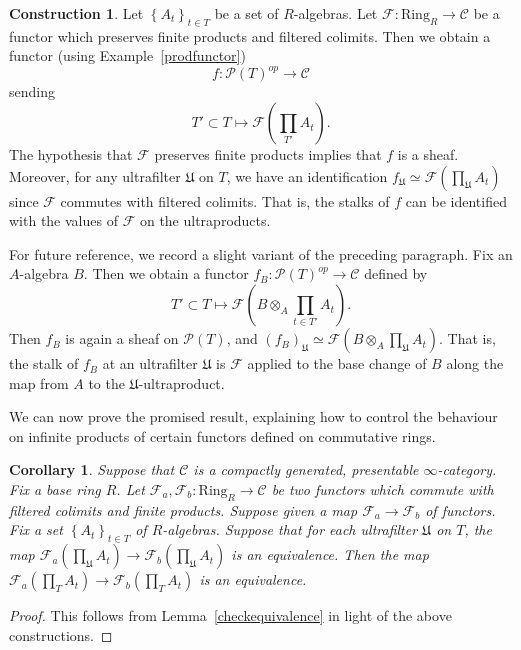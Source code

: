 \documentclass[reqno]{amsart}
\newtheorem{corollary}[theorem]{Corollary}
\theoremstyle{definition}
\newtheorem{cons}[theorem]{Construction}
\begin{document}
\begin{cons}
\label{varcons}
Let $\left\{A_t\right\}_{t \in T}$ be a  set of $R$-algebras. Let
$\mathcal{F}\colon  \mathrm{Ring}_R \to \mathcal{C}$ be a functor which preserves finite products and filtered colimits.  Then we obtain a functor (using Example~\ref{prodfunctor})
\[ f\colon  \mathcal{P}(T)^{op}  \to \mathcal{C} \]
sending 
\[ T' \subset T \mapsto \mathcal{F}( \prod_{T'} A_t) .  \]
The hypothesis that $\mathcal{F}$ preserves finite products implies that $f$ is a sheaf.  Moreover, for any ultrafilter $\mathfrak{U}$ on $T$, we have an identification $f_{\mathfrak{U}} \simeq \mathcal{F}( \prod_{\mathfrak{U}} A_t)$ since $\mathcal{F}$ commutes with filtered colimits. That is, the stalks of $f$ can be identified with the values of $\mathcal{F}$ on the ultraproducts. 

For future reference, we record a slight variant of the preceding paragraph. Fix an $A$-algebra $B$.  Then we obtain a functor 
$f_B\colon  \mathcal{P}(T)^{op} \to \mathcal{C}$ defined by 
\[ T' \subset T \mapsto \mathcal{F}( B \otimes_A \prod_{t \in T'} A_t ).  \]
Then $f_B$ is again a sheaf on $\mathcal{P}(T)$, and $(f_B)_{\mathfrak{U}} \simeq \mathcal{F}( B  \otimes_A \prod_{\mathfrak{U}} A_t)$.  That is, the stalk of $f_B$ at an ultrafilter $\mathfrak{U}$ is $\mathcal{F}$ applied to the base change of $B$ along the map from $A$ to the $\mathfrak{U}$-ultraproduct. 
\end{cons}


We can now prove the promised result, explaining how to control the behaviour on infinite products of certain functors defined on commutative rings.




\begin{corollary} 
\label{ultradetectsequivalence}
Suppose that $\mathcal{C}$ is a compactly generated, presentable $\infty$-category. 
Fix a base ring $R$. Let $\mathcal{F}_a, \mathcal{F}_b\colon  \mathrm{Ring}_R \to
\mathcal{C}$ be two functors which  commute with filtered colimits and finite
products. Suppose given a map $\mathcal{F}_a \to \mathcal{F}_b$ of functors.
Fix a set $\left\{A_t\right\}_{t \in T}$ of $R$-algebras.  Suppose that for each ultrafilter $\mathfrak{U}$ on $T$, the map $\mathcal{F}_a(\prod_{\mathfrak{U}} A_t ) \to \mathcal{F}_b( \prod_{\mathfrak{U}} A_t )$ is an equivalence.  Then the map $\mathcal{F}_a( \prod_T A_t) \to \mathcal{F}_b( \prod_T A_t )$ is an equivalence. 
\end{corollary} 
\begin{proof} 
This follows from Lemma~\ref{checkequivalence} in light of the above
constructions. 
\end{proof} 
\end{document}
